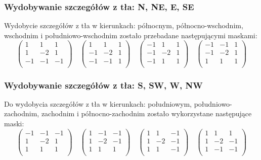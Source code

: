 \documentclass{classrep}
\begin{document}
\subsubsection{Wydobywanie szczegółów z tła: N, NE, E, SE}
Wydobycie szczegółów z tła w kierunkach: północnym, północno-wschodnim, wschodnim i południowo-wschodnim zostało przebadane następującymi maskami:
\[
 \begin{pmatrix}
  1 & 1 & 1 \\
  1 & -2 & 1 \\
  -1 & -1 & -1 \\
 \end{pmatrix}
\quad
 \begin{pmatrix}
  1 & 1 & 1 \\
  -1 & -2 & 1 \\
  -1 & -1 & 1 \\
 \end{pmatrix}
\quad
 \begin{pmatrix}
  -1 & 1 & 1 \\
  -1 & -2 & 1 \\
  -1 & 1 & 1 \\
 \end{pmatrix}
\quad
 \begin{pmatrix}
  -1 & -1 & 1 \\
  -1 & -2 & 1 \\
  1 & 1 & 1 \\
 \end{pmatrix}
\]

\subsubsection{Wydobywanie szczegółów z tła: S, SW, W, NW}
Do wydobycia szczegółów z tła w kierunkach: południowym, południowo-zachodnim, zachodnim i północno-zachodnim zostało wykorzystane następujące maski:
\[
 \begin{pmatrix}
  -1 & -1 & -1 \\
  1 & -2 & 1 \\
  1 & 1 & 1 \\
 \end{pmatrix}
\quad
 \begin{pmatrix}
  1 & -1 & -1 \\
  1 & -2 & -1 \\
  1 & 1 & 1 \\
 \end{pmatrix}
\quad
 \begin{pmatrix}
  1 & 1 & -1 \\
  1 & -2 & -1 \\
  1 & 1 & -1 \\
 \end{pmatrix}
\quad
 \begin{pmatrix}
  1 & 1 & 1 \\
  1 & -2 & -1 \\
  1 & -1 & -1 \\
 \end{pmatrix}
\]
\end{document}
